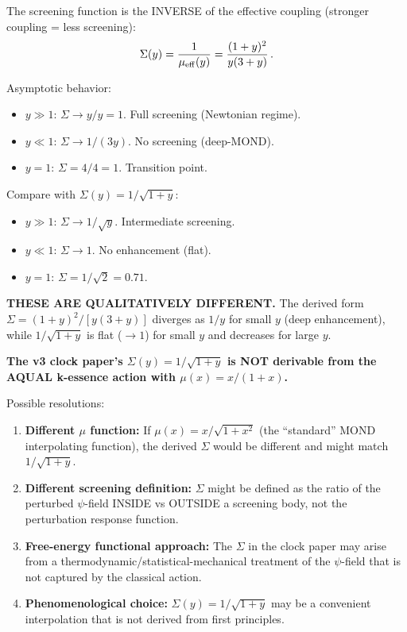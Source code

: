 \documentclass[11pt]{article}
\begin{document}
The screening function is the INVERSE of the effective coupling
(stronger coupling = less screening):
\begin{equation}
\Sigma(y) = \frac{1}{\mu_{\rm eff}(y)}
= \frac{(1+y)^2}{y(3+y)}\,.
\end{equation}

Asymptotic behavior:
\begin{itemize}
\item $y \gg 1$: $\Sigma \to y/y = 1$.  Full screening (Newtonian
  regime). \checkmark
\item $y \ll 1$: $\Sigma \to 1/(3y)$.  No screening (deep-MOND). \checkmark
\item $y = 1$: $\Sigma = 4/4 = 1$.  Transition point. \checkmark
\end{itemize}

Compare with $\Sigma(y) = 1/\sqrt{1+y}$:
\begin{itemize}
\item $y \gg 1$: $\Sigma \to 1/\sqrt{y}$.  Intermediate screening.
\item $y \ll 1$: $\Sigma \to 1$.  No enhancement (flat).
\item $y = 1$: $\Sigma = 1/\sqrt{2} = 0.71$.
\end{itemize}

\textbf{THESE ARE QUALITATIVELY DIFFERENT.}  The derived form
$\Sigma = (1+y)^2/[y(3+y)]$ diverges as $1/y$ for small $y$
(deep enhancement), while $1/\sqrt{1+y}$ is flat ($\to 1$) for
small $y$ and decreases for large $y$.

\textbf{The v3 clock paper's $\Sigma(y) = 1/\sqrt{1+y}$ is NOT
derivable from the AQUAL k-essence action with $\mu(x) = x/(1+x)$.}

Possible resolutions:
\begin{enumerate}
\item \textbf{Different $\mu$ function:}  If $\mu(x) = x/\sqrt{1+x^2}$
  (the ``standard'' MOND interpolating function), the derived $\Sigma$
  would be different and might match $1/\sqrt{1+y}$.
\item \textbf{Different screening definition:}  $\Sigma$ might be
  defined as the ratio of the perturbed $\psi$-field INSIDE vs OUTSIDE
  a screening body, not the perturbation response function.
\item \textbf{Free-energy functional approach:}  The $\Sigma$ in the
  clock paper may arise from a thermodynamic/statistical-mechanical
  treatment of the $\psi$-field that is not captured by the classical
  action.
\item \textbf{Phenomenological choice:}  $\Sigma(y) = 1/\sqrt{1+y}$
  may be a convenient interpolation that is not derived from first
  principles.
\end{enumerate}
\end{document}
